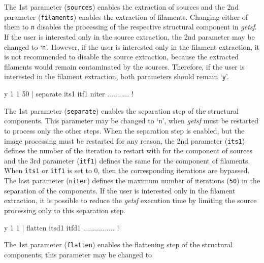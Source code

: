 \documentclass[a4paper,10pt]{article}
\begin{document}
The 1st parameter (\verb!sources!) enables the extraction of sources and the 2nd parameter (\verb!filaments!) enables the
extraction of filaments. Changing either of them to \verb!n! disables the processing of the respective structural component in
\textsl{getsf}. If the user is interested only in the source extraction, the 2nd parameter may be changed to `\verb!n!'. However,
if the user is interested only in the filament extraction, it is not recommended to disable the source extraction, because the
extracted filaments would remain contaminated by the sources. Therefore, if the user is interested in the filament extraction, both
parameters should remain `\verb!y!'.
\begin{verbnobox}[\mbox{}\small]
 y 1 1 50            | separate its1 itf1 niter ........... !
\end{verbnobox}
The 1st parameter (\verb!separate!) enables the separation step of the structural components. This parameter may be changed to
`\verb!n!', when \textsl{getsf} must be restarted to process only the other steps. When the separation step is enabled, but the
image processing must be restarted for any reason, the 2nd parameter (\verb!its1!) defines the number of the iteration to restart
with for the component of sources and the 3rd parameter (\verb!itf1!) defines the same for the component of filaments. When
\verb!its1! or \verb!itf1! is set to 0, then the corresponding iterations are bypassed. The last parameter (\verb!niter!) defines
the maximum number of iterations (\verb!50!) in the separation of the components. If the user is interested only in the filament
extraction, it is possible to reduce the \textsl{getsf} execution time by limiting the source processing only to this separation
step.
\begin{verbnobox}[\mbox{}\small]
 y 1 1               | flatten itsd1 itfd1 ................ !
\end{verbnobox}
The 1st parameter (\verb!flatten!) enables the flattening step of the structural components; this parameter may be changed to
\end{document}
